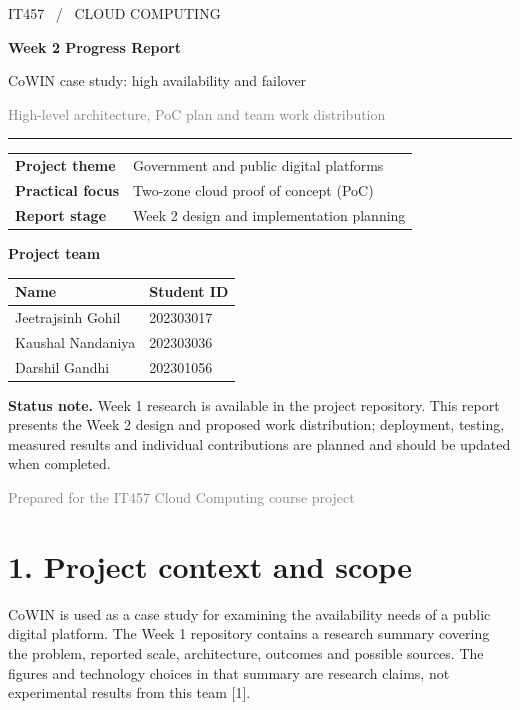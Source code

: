 \documentclass[11pt,a4paper]{article}
\newcommand{\sectionline}[1]{\section*{\color{navy}#1}}
\begin{document}
\thispagestyle{empty}
{\color{teal}\large IT457 \ / \ CLOUD COMPUTING}\par\vspace{10mm}
{\color{navy}\LARGE\bfseries Week 2 Progress Report}\par\vspace{3mm}
{\Large CoWIN case study: high availability and failover}\par\vspace{5mm}
\textcolor{graytext}{High-level architecture, PoC plan and team work distribution}\par
\vspace{8mm}\hrule\vspace{7mm}
\begin{tabularx}{\textwidth}{@{}lY@{}}
\textbf{Project theme} & Government and public digital platforms \\
\textbf{Practical focus} & Two-zone cloud proof of concept (PoC) \\
\textbf{Report stage} & Week 2 design and implementation planning \\
\end{tabularx}
\par\vspace{8mm}
\textbf{Project team}\par
\begin{tabularx}{\textwidth}{@{}Yl@{}}\toprule
\textbf{Name} & \textbf{Student ID}\\\midrule
Jeetrajsinh Gohil & 202303017\\
Kaushal Nandaniya & 202303036\\
Darshil Gandhi & 202301056\\\bottomrule
\end{tabularx}
\par\vspace{6mm}
\colorbox{pale}{\parbox{\dimexpr\textwidth-2\fboxsep\relax}{\textbf{Status note.} Week 1 research is available in the project repository. This report presents the Week 2 design and proposed work distribution; deployment, testing, measured results and individual contributions are planned and should be updated when completed.}}
\vfill
\textcolor{graytext}{Prepared for the IT457 Cloud Computing course project}\par
\newpage
\sectionline{1. Project context and scope}
CoWIN is used as a case study for examining the availability needs of a public digital platform. The Week 1 repository contains a research summary covering the problem, reported scale, architecture, outcomes and possible sources. The figures and technology choices in that summary are research claims, not experimental results from this team [1].
\end{document}
